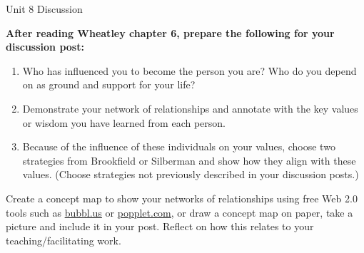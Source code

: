 \documentclass[
]{book}
\providecommand{\tightlist}{%
  \setlength{\itemsep}{0pt}\setlength{\parskip}{0pt}}
\begin{document}
\begin{assessment}
{Unit 8 Discussion}

\textbf{After reading Wheatley chapter 6, prepare the following for your
discussion post:}

\begin{enumerate}
\def\labelenumi{\arabic{enumi}.}
\tightlist
\item
  Who has influenced you to become the person you are? Who do you depend
  on as ground and support for your life?\\
\item
  Demonstrate your network of relationships and annotate with the key
  values or wisdom you have learned from each person.\\
\item
  Because of the influence of these individuals on your values, choose
  two strategies from Brookfield or Silberman and show how they align
  with these values. (Choose strategies not previously described in your
  discussion posts.)
\end{enumerate}

Create a concept map to show your networks of relationships using free
Web 2.0 tools such as \href{https://bubbl.us/}{bubbl.us} or
\href{http://popplet.com/}{popplet.com}, or draw a concept map on paper,
take a picture and include it in your post. Reflect on how this relates
to your teaching/facilitating work.
\end{assessment}
\end{document}

